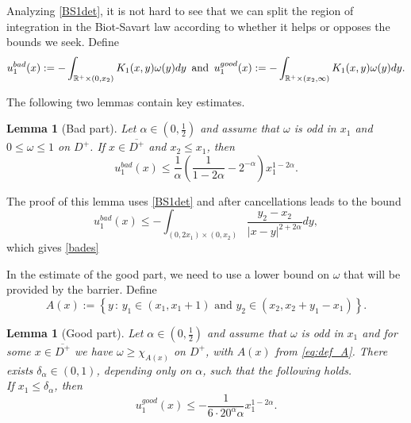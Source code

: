 \documentclass[reqno,centertags, 11pt]{amsart}
\newtheorem{lemma}[theorem]{Lemma}
\def \Rm {\mathbb R}
\newcommand{\be}{\mathbf e} \newcommand{\bh}{\mathbf h}
\newcommand{\lb}{\label}
\renewcommand{\be}{\begin{equation}}
\newcommand{\ee}{\end{equation}}
\begin{document}
Analyzing \eqref{BS1det}, it is not hard to see that we can split the region of integration in the Biot-Savart
law according to whether it helps or opposes the bounds we seek. Define
\[
u_{1}^{bad}(x) := - \int_{\Rm^+\times(0,x_2)} K_1(x,y) \omega(y) dy \,\,\,
{\rm and} \,\,\,
u_{1}^{good}(x) := - \int_{\Rm^+\times(x_2,\infty)} K_1(x,y) \omega(y) dy.
\]

The following two lemmas contain key estimates.

\begin{lemma}[Bad part]
Let $\alpha\in(0,\frac 12)$ and assume that $\omega$ is odd in $x_1$ and $0\le \omega\le 1$ on $D^+$.
If $x\in \overline{D^+}$ and $x_2\leq x_1$, then
\be\lb{bades}
u_1^{bad}(x) \leq \frac{1}{\alpha}\left(\frac{1}{1-2\alpha} -2^{-\alpha}\right) x_1^{1-2\alpha}.
\ee
\label{lemma:bad_parts_u1}
\end{lemma}
The proof of this lemma uses \eqref{BS1det} and after cancellations leads to the bound
\be\lb{bades1} u_1^{bad}(x) \leq -\int_{(0,2x_1)\times(0,x_2)} \frac{y_2-x_2}{|x-y|^{2+2\alpha}}  dy, \ee
which gives \eqref{bades}

In the estimate of the good part, we need to use a lower bound on $\omega$ that will be provided by the barrier. Define
\begin{equation}
A(x) := \left\{ y\,:\,  y_1\in \left(x_1,x_1+1 \right) \text{ and } y_2 \in(x_2, x_2 + y_1 - x_1) \right\}.
\label{eq:def_A}
\end{equation}
\begin{lemma}[Good part]
\label{lemma:u1_good}
Let $\alpha\in(0,\frac 12)$ and assume that $\omega$ is odd in $x_1$ and for some $x\in  \overline{D^+}$
we have $\omega\ge \chi_{A(x)}$ on $D^+$, with $A(x)$ from \eqref{eq:def_A}.
There exists $\delta_\alpha\in(0,1)$, depending only on $\alpha$, such that the following holds.
\\[0.2cm]
If $x_1\le \delta_\alpha$, then
\begin{equation*}%
u_1^{good}(x) \leq -\frac{1}{6\cdot 20^\alpha \alpha}x_1^{1-2\alpha}.
\end{equation*}
\end{lemma}
\end{document}
